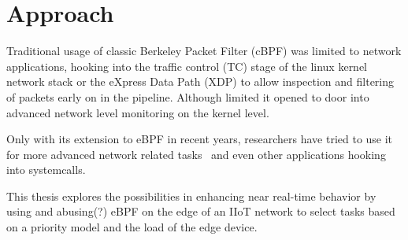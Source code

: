 \section{Approach}


Traditional usage of classic Berkeley Packet Filter (cBPF) was limited to
network applications, hooking into the traffic control (TC) stage of the linux
kernel network stack or the eXpress Data Path (XDP) to allow inspection and
filtering of packets early on in the pipeline. Although limited it opened to
door into advanced network level monitoring on the kernel level.

Only with its extension to eBPF in recent years, researchers have tried to use
it for more advanced network related tasks~\cite{miano_creating_2018} and even
other applications hooking into systemcalls.

This thesis explores the possibilities in enhancing near real-time behavior by
using and abusing(?) eBPF on the edge of an IIoT network to select tasks based
on a priority model and the load of the edge device.
